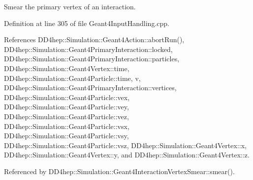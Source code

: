 Smear the primary vertex of an interaction. 



Definition at line 305 of file Geant4\+Input\+Handling.\+cpp.



References D\+D4hep\+::\+Simulation\+::\+Geant4\+Action\+::abort\+Run(), D\+D4hep\+::\+Simulation\+::\+Geant4\+Primary\+Interaction\+::locked, D\+D4hep\+::\+Simulation\+::\+Geant4\+Primary\+Interaction\+::particles, D\+D4hep\+::\+Simulation\+::\+Geant4\+Vertex\+::time, D\+D4hep\+::\+Simulation\+::\+Geant4\+Particle\+::time, v, D\+D4hep\+::\+Simulation\+::\+Geant4\+Primary\+Interaction\+::vertices, D\+D4hep\+::\+Simulation\+::\+Geant4\+Particle\+::vex, D\+D4hep\+::\+Simulation\+::\+Geant4\+Particle\+::vey, D\+D4hep\+::\+Simulation\+::\+Geant4\+Particle\+::vez, D\+D4hep\+::\+Simulation\+::\+Geant4\+Particle\+::vsx, D\+D4hep\+::\+Simulation\+::\+Geant4\+Particle\+::vsy, D\+D4hep\+::\+Simulation\+::\+Geant4\+Particle\+::vsz, D\+D4hep\+::\+Simulation\+::\+Geant4\+Vertex\+::x, D\+D4hep\+::\+Simulation\+::\+Geant4\+Vertex\+::y, and D\+D4hep\+::\+Simulation\+::\+Geant4\+Vertex\+::z.



Referenced by D\+D4hep\+::\+Simulation\+::\+Geant4\+Interaction\+Vertex\+Smear\+::smear().

